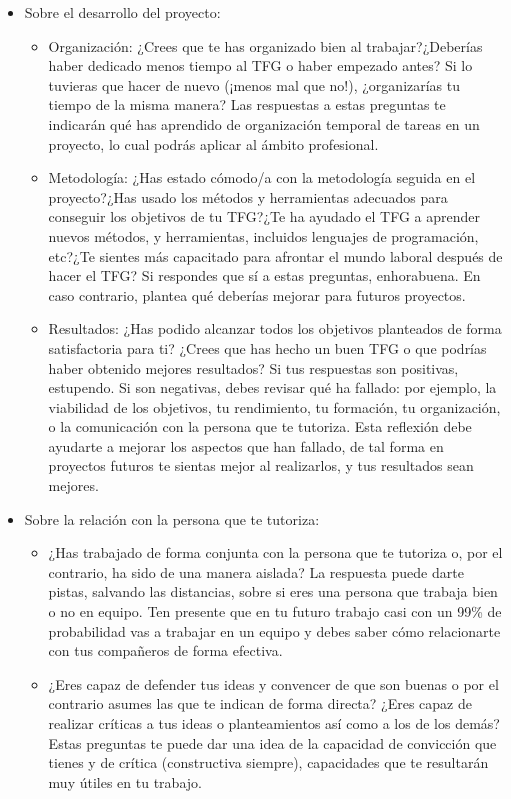 \begin{itemize}
    \item Sobre el desarrollo del proyecto:
        \begin{itemize}
            \item Organización: ¿Crees que te has organizado bien al trabajar?¿Deberías haber dedicado menos tiempo al TFG o haber empezado antes? Si lo tuvieras que hacer de nuevo (¡menos mal que no!), ¿organizarías tu tiempo de la misma manera? Las respuestas a estas preguntas te indicarán qué has aprendido de organización temporal de tareas en un proyecto, lo cual podrás aplicar al ámbito profesional.
            \item Metodología: ¿Has estado cómodo/a con la metodología seguida en el proyecto?¿Has usado los métodos y herramientas adecuados para conseguir los objetivos de tu TFG?¿Te ha ayudado el TFG a aprender nuevos métodos, y herramientas, incluidos lenguajes de programación, etc?¿Te sientes más capacitado para afrontar el mundo laboral después de hacer el TFG? Si respondes que sí a estas preguntas, enhorabuena. En caso contrario, plantea qué deberías mejorar para futuros proyectos.
            \item Resultados: ¿Has podido alcanzar todos los objetivos planteados de forma satisfactoria para ti? ¿Crees que has hecho un buen TFG o que podrías haber obtenido mejores resultados? Si tus respuestas son positivas, estupendo. Si son negativas, debes revisar qué ha fallado: por ejemplo, la viabilidad de los objetivos, tu rendimiento, tu formación, tu organización, o la comunicación con la persona que te tutoriza. Esta reflexión debe ayudarte a mejorar los aspectos que han fallado, de tal forma en proyectos futuros te sientas mejor al realizarlos, y tus resultados sean mejores.
        \end{itemize}
    \item Sobre la relación con la persona que te tutoriza:
        \begin{itemize}
            \item ¿Has trabajado de forma conjunta con la persona que te tutoriza o, por el contrario, ha sido de una manera aislada? La respuesta puede darte pistas, salvando las distancias, sobre si eres una persona que trabaja bien o no en equipo. Ten presente que en tu futuro trabajo casi con un 99\% de probabilidad vas a trabajar en un equipo y debes saber cómo relacionarte con tus compañeros de forma efectiva. 
            \item ¿Eres capaz de defender tus ideas y convencer de que son buenas o por el contrario asumes las que te indican de forma directa? ¿Eres capaz de realizar críticas a tus ideas o planteamientos así como a los de los demás? Estas preguntas te puede dar una idea de la capacidad de convicción que tienes y de crítica (constructiva siempre), capacidades que te resultarán muy útiles en tu trabajo.

\end{itemize}
\end{itemize}

